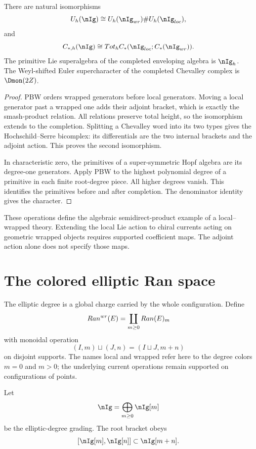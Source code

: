\begin{theorem}
There are natural isomorphisms
\[
 \widehat U_h(\nIg)
 \cong\widehat U_h(\nIg_{\wrap})\#\widehat U_h(\nIg_{\loc}),
\]
and
\[
 \widehat C_{*,h}(\nIg)
 \cong\widehat{\operatorname{Tot}}_h
 C_*(\nIg_{\loc};C_*(\nIg_{\wrap})).
\]
The primitive Lie superalgebra of the completed enveloping algebra
is \(\widehat{\nIg}_h\). The Weyl-shifted Euler supercharacter
of the completed Chevalley complex is \(\Dmon(2Z)\).
\end{theorem}
\begin{proof}
PBW orders wrapped generators before local generators. Moving a
local generator past a wrapped one adds their adjoint bracket,
which is exactly the smash-product relation. All relations preserve
total height, so the isomorphism extends to the completion.
Splitting a Chevalley word into its two types gives the
Hochschild--Serre bicomplex: its differentials are the two internal
brackets and the adjoint action. This proves the second isomorphism.

In characteristic zero, the primitives of a super-symmetric Hopf
algebra are its degree-one generators. Apply PBW to the highest
polynomial degree of a primitive in each finite root-degree piece.
All higher degrees vanish. This identifies the primitives before
and after completion. The denominator identity gives the character.
\end{proof}

These operations define the algebraic semidirect-product example
of a local--wrapped theory. Extending the local Lie action to chiral
currents acting on geometric wrapped objects requires supported
coefficient maps. The adjoint action alone does not specify those
maps.

\section{The colored elliptic Ran space}
The elliptic degree is a global charge carried by the whole configuration.  Define
\[
 Ran^{wr}(E)=\coprod_{m\ge0}Ran(E)_m
\]
with monoidal operation
\[
 (I,m)\sqcup(J,n)=(I\sqcup J,m+n)
\]
on disjoint supports. The names local and wrapped refer here to
the degree colors $m=0$ and $m>0$; the underlying current operations
remain supported on configurations of points.

Let
\[
 \nIg=\bigoplus_{m\ge0}\nIg[m]
\]
be the elliptic-degree grading.  The root bracket obeys
\[
 [\nIg[m],\nIg[n]]\subset\nIg[m+n].
\]

